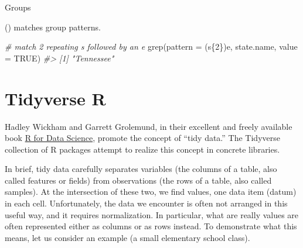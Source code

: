 \documentclass[
]{book}
\newenvironment{Shaded}{\begin{snugshade}}{\end{snugshade}}
\newcommand{\AttributeTok}[1]{\textcolor[rgb]{0.77,0.63,0.00}{#1}}
\newcommand{\CommentTok}[1]{\textcolor[rgb]{0.56,0.35,0.01}{\textit{#1}}}
\newcommand{\ConstantTok}[1]{\textcolor[rgb]{0.00,0.00,0.00}{#1}}
\newcommand{\FunctionTok}[1]{\textcolor[rgb]{0.00,0.00,0.00}{#1}}
\newcommand{\NormalTok}[1]{#1}
\newcommand{\StringTok}[1]{\textcolor[rgb]{0.31,0.60,0.02}{#1}}
\begin{document}
Groups

() matches group patterns.

\begin{Shaded}
\begin{Highlighting}[]
\CommentTok{\# match 2 repeating \textquotesingle{}s\textquotesingle{} followed by an \textquotesingle{}e\textquotesingle{}}
\FunctionTok{grep}\NormalTok{(}\AttributeTok{pattern =} \StringTok{\textquotesingle{}(s\{2\})e\textquotesingle{}}\NormalTok{, state.name, }\AttributeTok{value =} \ConstantTok{TRUE}\NormalTok{)}
\CommentTok{\#\textgreater{} [1] "Tennessee"}
\end{Highlighting}
\end{Shaded}

\hypertarget{tidyverse-r}{%
\chapter{Tidyverse R}\label{tidyverse-r}}

Hadley Wickham and Garrett Grolemund, in their excellent and freely available
book \href{https://r4ds.had.co.nz/}{R for Data Science}, promote the concept of ``tidy data.'' The Tidyverse collection of R packages attempt to realize this concept in concrete libraries.

In brief, tidy data carefully separates variables (the columns of a table, also called
features or fields) from observations (the rows of a table, also called samples). At
the intersection of these two, we find values, one data item (datum) in each cell.
Unfortunately, the data we encounter is often not arranged in this useful way, and
it requires normalization. In particular, what are really values are often represented
either as columns or as rows instead. To demonstrate what this means, let us
consider an example (a small elementary school class).
\end{document}
